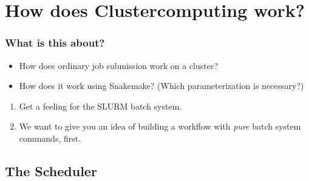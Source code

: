 \section{How does Clustercomputing work?}
{   
}


\begin{frame}
  \frametitle{What is this about?}
    \begin{question}
   	  \begin{itemize}
        \item How does ordinary job submission work on a cluster?
        \item How does it work using Snakemake? (Which parameterization is necessary?)
      \end{itemize}
   \end{question}
   \begin{docs}[Objectives]
   	 \begin{enumerate}
   	 	\item Get a feeling for the SLURM batch system.
   	 	\item We want to give you an idea of building a workflow with \emph{pure} batch system commands, first.
     \end{enumerate}
   \end{docs}
\end{frame}


\subsection*{The \slurm Scheduler}

